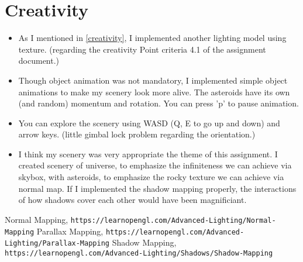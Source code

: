 \documentclass[10pt,a4paper]{article}
\begin{document}
	\section{Creativity}	
	\begin{itemize}
		\item As I mentioned in \ref{creativity}, I implemented another lighting model using texture. (regarding the creativity Point criteria 4.1 of the assignment document.)
		
		\item Though object animation was not mandatory, I implemented simple object animations to make my scenery look more alive. The asteroids have its own (and random) momentum and rotation. You can press 'p' to pause animation.
		
		\item You can explore the scenery using WASD (Q, E to go up and down) and arrow keys. (little gimbal lock problem regarding the orientation.) 
		
		\item I think my scenery was very appropriate the theme of this assignment. I created scenery of universe, to emphasize the infiniteness we can achieve via skybox, with asteroids, to emphasize the rocky texture we can achieve via normal map. If I implemented the shadow mapping properly, the interactions of how shadows cover each other would have been magnificiant. 
	\end{itemize}

	\begin{thebibliography}{9}
		Normal Mapping,
		\texttt{https://learnopengl.com/Advanced-Lighting/Normal-Mapping}
		Parallax Mapping,
		\texttt{https://learnopengl.com/Advanced-Lighting/Parallax-Mapping}
		Shadow Mapping,
		\texttt{https://learnopengl.com/Advanced-Lighting/Shadows/Shadow-Mapping}
	\end{thebibliography}
\end{document}
